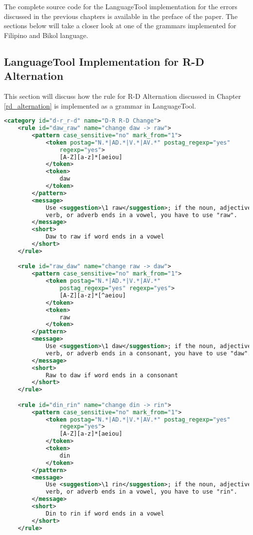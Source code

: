 The complete source code for the LanguageTool implementation for the errors discussed in the previous chapters is available in the preface of the paper. The sections below will take a closer look at one of the grammars implemented for Filipino and Bikol language.


\subsection{LanguageTool Implementation for R-D Alternation}

This section will discuss how the rule for R-D Alternation discussed in Chapter \ref{rd_alternation} is implemented as a grammar in LanguageTool.

\begin{lstlisting}[language= XML, caption=Grammar for R-D Alternation]
<category id="d-r_r-d" name="D-R R-D Change">
    <rule id="daw_raw" name="change daw -> raw">
        <pattern case_sensitive="no" mark_from="1">
            <token postag="N.*|AD.*|V.*|AV.*" postag_regexp="yes" 
                regexp="yes">
                [A-Z][a-z]*[aeiou]
            </token>
            <token>
                daw
            </token>
        </pattern>
        <message>
            Use <suggestion>\1 raw</suggestion>; if the noun, adjective, 
            verb, or adverb ends in a vowel, you have to use "raw".
        </message>
        <short>
            Daw to raw if word ends in a vowel
        </short>
    </rule>

    <rule id="raw_daw" name="change raw -> daw">
        <pattern case_sensitive="no" mark_from="1">
            <token postag="N.*|AD.*|V.*|AV.*" 
                postag_regexp="yes" regexp="yes">
                [A-Z][a-z]*[^aeiou]
            </token>
            <token>
                raw
            </token>
        </pattern>
        <message>
            Use <suggestion>\1 daw</suggestion>; if the noun, adjective, 
            verb, or adverb ends in a consonant, you have to use "daw".
        </message>
        <short>
            Raw to daw if word ends in a consonant
        </short>
    </rule>

    <rule id="din_rin" name="change din -> rin">
        <pattern case_sensitive="no" mark_from="1">
            <token postag="N.*|AD.*|V.*|AV.*" postag_regexp="yes" 
                regexp="yes">
                [A-Z][a-z]*[aeiou]
            </token>
            <token>
                din
            </token>
        </pattern>
        <message>
            Use <suggestion>\1 rin</suggestion>; if the noun, adjective,
            verb, or adverb ends in a vowel, you have to use "rin".
        </message>
        <short>
            Din to rin if word ends in a vowel
        </short>
    </rule>


\end{lstlisting}
